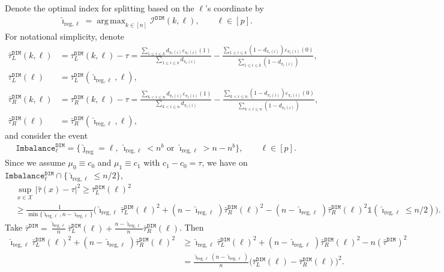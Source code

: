 \documentclass[10pt]{article}
\DeclareMathOperator*{\argmax}{arg\,max}
\def\X{\mathcal{X}}
\def\I{\mathscr{I}}
\def\DIM{\mathtt{DIM}}
\def\reg{\text{reg}}
\newcommand{\Indicator}{\mathds{1}}
\theoremstyle{definition}
\theoremstyle{remark}
\begin{document}
Denote the optimal index for splitting based on the $\ell$'s coordinate by
\begin{align*}
    \hat{\imath}_{\reg,\ell} = \argmax_{k \in [n]} \I^{\DIM}(k,\ell), \qquad \ell \in [p].
\end{align*}
For notational simplicity, denote
\begin{align*}
    \bar \tau^\DIM_L(k, \ell) & = \tau^\DIM_L(k, \ell) - \tau = \frac{\sum_{1 \leq i \leq k}d_{\pi_{\ell}(i)} \varepsilon_{\pi_{\ell}(i)}(1)}{\sum_{1 \leq i \leq k}d_{\pi_{\ell}(i)}} - \frac{\sum_{1 \leq i \leq k}(1 - d_{\pi_{\ell}(i)}) \varepsilon_{\pi_{\ell}(i)}(0)}{\sum_{1 \leq i \leq k}(1 - d_{\pi_{\ell}(i)})}, \\
    \bar \tau_L^\DIM(\ell) & = \bar \tau_L^\DIM(\hat{\imath}_{\reg,\ell},\ell),\\
    \bar \tau^\DIM_R(k,\ell) & = \tau^\DIM_R(k,\ell) - \tau = \frac{\sum_{k < i \leq n}d_{\pi_{\ell}(i)} \varepsilon_{\pi_{\ell}(i)}(1)}{\sum_{k < i \leq n}d_{\pi_{\ell}(i)}} - \frac{\sum_{k < i \leq n}(1 - d_{\pi_{\ell}(i)}) \varepsilon_{\pi_{\ell}(i)}(0)}{\sum_{k < i \leq n}(1 - d_{\pi_{\ell}(i)})}, \\
    \bar \tau_R^\DIM(\ell) & = \bar \tau_R^\DIM(\hat{\imath}_{\reg,\ell},\ell),
\end{align*}
and consider the event
\begin{align*}
    \mathtt{Imbalance}_{\ell}^\DIM
    =
    \{\hat{\jmath}_\reg=\ell,\ \hat{\imath}_{\reg,\ell}< n^b
    \text{ or } \hat{\imath}_{\reg,\ell}> n-n^b\},
    \qquad \ell \in [p].
\end{align*}
Since we assume $\mu_0 \equiv c_0$ and $\mu_1 \equiv c_1$ with $c_1 - c_0 = \tau$, we have on $\mathtt{Imbalance}_{\ell}^\DIM \cap \{\hat{\imath}_{\reg,\ell} \leq n/2\}$,
\begin{align*}
    & \sup_{x \in \X}|\hat\tau(x) - \tau|^2
     \geq \bar \tau^\DIM_L(\ell)^2 \\
    & \geq \frac{1}{\min\{\hat{\imath}_{\reg,\ell}, n - \hat{\imath}_{\reg,\ell}\}} \bigg(\hat{\imath}_{\reg,\ell} \bar{\tau}_L^{\DIM}(\ell)^2 + (n - \hat{\imath}_{\reg,\ell}) \bar{\tau}_R^{\DIM}(\ell)^2 - (n - \hat{\imath}_{\reg,\ell}) \bar{\tau}_R^{\DIM}(\ell)^2 \Indicator(\hat{\imath}_{\reg,\ell} \leq n/2) \bigg).
\end{align*}
Take $\bar\tau^{\DIM} = \frac{\hat{\imath}_{\reg,\ell}}{n} \bar\tau^\DIM_L(\ell) + \frac{n - \hat{\imath}_{\reg,\ell}}{n} \bar\tau^\DIM_R(\ell)$. Then
\begin{align*}
    \hat{\imath}_{\reg,\ell} \bar{\tau}_L^{\DIM}(\ell)^2 + (n - \hat{\imath}_{\reg,\ell}) \bar{\tau}_R^{\DIM}(\ell)^2 
    & \geq \hat{\imath}_{\reg,\ell} \bar{\tau}_L^{\DIM}(\ell)^2 + (n - \hat{\imath}_{\reg,\ell}) \bar{\tau}_R^{\DIM}(\ell)^2 - n(\bar\tau^\DIM)^2 \\
    & = \frac{\hat{\imath}_{\reg,\ell}(n - \hat{\imath}_{\reg,\ell})}{n}\bigg(\bar\tau_L^\DIM(\ell) - \bar \tau_R^\DIM(\ell)\bigg)^2.
\end{align*}
\end{document}
